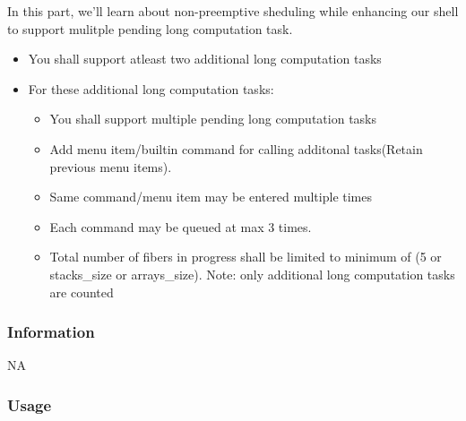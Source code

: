 \documentclass[]{book}
\begin{document}
In this part, we'll learn about non-preemptive sheduling while enhancing
our shell to support mulitple pending long computation task.

\begin{itemize}
\itemsep1pt\parskip0pt
\item
  You shall support atleast two additional long computation tasks
\item
  For these additional long computation tasks:

  \begin{itemize}
  \itemsep1pt\parskip0pt
  \item
    You shall support multiple pending long computation tasks
  \item
    Add menu item/builtin command for calling additonal tasks(Retain
    previous menu items).
  \item
    Same command/menu item may be entered multiple times
  \item
    Each command may be queued at max 3 times.
  \item
    Total number of fibers in progress shall be limited to minimum of (5
    or stacks\_size or arrays\_size). Note: only additional long
    computation tasks are counted
  \end{itemize}
\end{itemize}

\subsubsection*{Information}\label{information-6}

NA

\subsubsection*{Usage}\label{usage-6}
\end{document}
